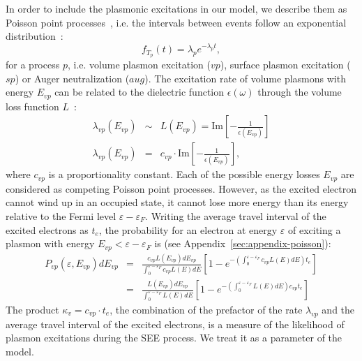 \begin{refsection}
In order to include the plasmonic excitations in our model, we describe 
them as Poisson point processes~\cite{Egerton2009}, i.e. the intervals between events follow an 
exponential distribution~\cite{MITopencourseware}: 
\begin{equation} 
f_{T_p} (t) = \lambda_p e^{-\lambda_p t}, 
\end{equation} 
for a process $p$, i.e. volume plasmon excitation ($vp$), surface plasmon 
excitation ($sp$) or Auger neutralization ($aug$). The 
excitation rate of volume plasmons with energy $E_{vp}$ can be related to the 
dielectric function $\epsilon (\omega)$ through the volume loss function 
$L$~\cite{Raether1980}: 
\begin{eqnarray} 
\lambda_{vp}(E_{vp}) &\sim& L(E_{vp}) =
\text{Im}\left[-\frac{1}{\epsilon(E_{vp})}\right] \\
\lambda_{vp}(E_{vp}) &=& c_{vp} \cdot \text{Im}\left[-\frac{1}{\epsilon(E_{vp})}\right],
\end{eqnarray} 
where $c_{vp}$ is a proportionality constant.
Each of the possible energy losses $E_{vp}$ are considered as competing Poisson 
point processes. However, as the excited electron cannot wind up in an 
occupied state, it cannot lose more energy than its energy relative to the 
Fermi level $\varepsilon - \varepsilon_F$. Writing the average travel 
interval of the excited electrons as $t_e$, the probability for an electron at 
energy $\varepsilon$ of exciting a plasmon with energy $E_{vp} < \varepsilon - 
\varepsilon_F$ is (see Appendix~\ref{sec:appendix-poisson}): 
\begin{eqnarray} \label{quotas:eq-vp_prob}
P_{vp}(\varepsilon, E_{vp}) dE_{vp} &=& \frac{c_{vp} 
L(E_{vp})dE_{vp}}{\int_0^{\varepsilon - \varepsilon_F} c_{vp} L(E) dE
}\left[1-e^{-\left(\int_0^{\varepsilon - \varepsilon_F} c_{vp} L(E) dE\right) t_e 
}\right] \\ 
&=& \frac{L(E_{vp})dE_{vp}}{\int_0^{\varepsilon - \varepsilon_F} L(E) dE
}\left[1-e^{-\left(\int_0^{\varepsilon - \varepsilon_F} L(E) dE\right) c_{vp} t_e 
}\right] 
\end{eqnarray} 
The product $\kappa_v = c_{vp} \cdot t_e$, the combination of the prefactor of the 
rate $\lambda_{vp}$ and the average travel interval of the excited electrons, is a 
measure of the likelihood of plasmon excitations during the \gls{SEE} process. We 
treat it as a parameter of the model. 
 

\end{refsection}

